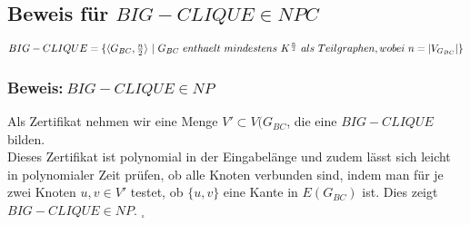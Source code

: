 \subsection*{Beweis für $BIG-CLIQUE \in NPC$}
$BIG-CLIQUE =\\ \{\langle G_{BC},\frac{n}{2}\rangle\ |\ G_{BC}\ enthaelt\ mindestens\ K^{\frac{n}{2}}\ als\ Teilgraphen, wobei\ n=|V_{G_{BC}}|\}$

\subsubsection*{Beweis:$\ BIG-CLIQUE \in NP$}
Als Zertifikat nehmen wir eine Menge $V' \subset V(G_{BC}$, die eine $BIG-CLIQUE$ bilden.\\
Dieses Zertifikat ist polynomial in der Eingabelänge und zudem lässt sich leicht in polynomialer Zeit prüfen, ob alle Knoten verbunden sind, indem man für je zwei Knoten $u, v \in V'$ testet, ob $\{u,v\}$ eine Kante in $E(G_{BC})$ ist. Dies zeigt $BIG-CLIQUE \in NP$. $ _\square$ 